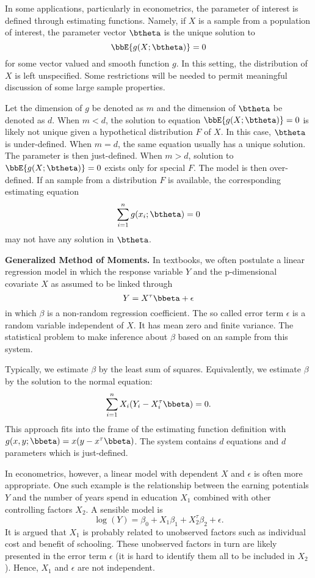 In some applications, particularly in econometrics, the parameter of interest
is defined through estimating functions. Namely, if $X$ is a  sample from a
population of interest, the parameter vector $\btheta$ is the unique solution to
\[
\bbE \{ g(X; \btheta) \} = 0
\]
for some vector valued and smooth function $g$.
In this setting, the distribution of $X$ is left unspecified.
Some restrictions will be needed to permit meaningful
discussion of some large sample properties.

Let the dimension of $g$ be denoted as $m$ and the dimension of
$\btheta$ be denoted as $d$. When $m < d$, the solution to equation 
$\bbE \{ g(X; \btheta) \} = 0$ is likely not unique
given a hypothetical distribution $F$ of $X$. 
In this case, $\btheta$ is under-defined.
When $m=d$, the same equation usually has a unique
solution. The parameter is then just-defined.
When $m > d$, solution to $\bbE \{ g(X; \btheta) \} = 0$ exists only for
special $F$. The model is then over-defined.
If an \iid sample from a distribution $F$
is available, the corresponding estimating equation
\[
\sum_{i=1}^n g(x_i; \btheta) = 0
\]
may not have any solution in $\btheta$.

\vs\vs
\noindent
{\bf Generalized Method of Moments.}
In textbooks, we often postulate a linear regression
model in which the response variable $Y$ and the p-dimensional
covariate $X$ as assumed to be linked through
\[
Y = X^\tau \bbeta + \epsilon
\]
in which $\beta$ is a non-random regression coefficient.
The so called error term $\epsilon$ is a random variable independent of $X$.
It has mean zero and finite variance.
The statistical problem to make inference about $\beta$ based
on an \iid sample from this system. 

Typically, we estimate $\beta$ by the least sum of squares. Equivalently,
we estimate $\beta$ by the solution to the normal equation:
\[
\sum_{i=1}^n X_i ( Y_i - X_i^\tau \bbeta) = 0.
\]
This approach fits into the frame of the estimating function definition
with $g(x, y; \bbeta) = x (y - x^\tau \bbeta)$. The system contains
$d$ equations and $d$ parameters which is just-defined.

In econometrics, however, a linear model with dependent $X$ and $\epsilon$
is often more appropriate. One such example is the relationship between
the earning potentials $Y$ and the number of years spend in education $X_1$
combined with other controlling factors $X_2$. A sensible model is
\[
\log (Y) = \beta_0 + X_1 \beta_1 + X_2^\tau \beta_2 + \epsilon.
\]
It is argued that $X_1$ is probably related to unobserved factors
such as individual cost and benefit of schooling. These unobserved
factors in turn are likely presented in the error term $\epsilon$
(it is hard to identify them all to be included in $X_2$).
Hence, $X_1$ and $\epsilon$ are not independent.

